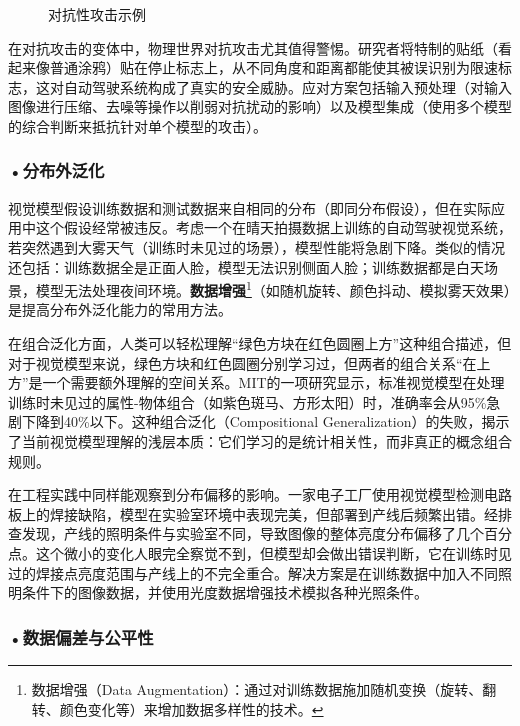 \begin{figure}[H]
\centering
{}
\caption{对抗性攻击示例}
\label{fig:ch2_2_20}
\end{figure}

在对抗攻击的变体中，物理世界对抗攻击尤其值得警惕。研究者将特制的贴纸（看起来像普通涂鸦）贴在停止标志上，从不同角度和距离都能使其被误识别为限速标志，这对自动驾驶系统构成了真实的安全威胁。应对方案包括输入预处理（对输入图像进行压缩、去噪等操作以削弱对抗扰动的影响）以及模型集成（使用多个模型的综合判断来抵抗针对单个模型的攻击）。

\subsubsection*{\textbf{•分布外泛化}}

视觉模型假设训练数据和测试数据来自相同的分布（即同分布假设），但在实际应用中这个假设经常被违反。考虑一个在晴天拍摄数据上训练的自动驾驶视觉系统，若突然遇到大雾天气（训练时未见过的场景），模型性能将急剧下降。类似的情况还包括：训练数据全是正面人脸，模型无法识别侧面人脸；训练数据都是白天场景，模型无法处理夜间环境。\textbf{数据增强}\footnote{数据增强（Data Augmentation）：通过对训练数据施加随机变换（旋转、翻转、颜色变化等）来增加数据多样性的技术。}（如随机旋转、颜色抖动、模拟雾天效果）是提高分布外泛化能力的常用方法。

在组合泛化方面，人类可以轻松理解“绿色方块在红色圆圈上方”这种组合描述，但对于视觉模型来说，绿色方块和红色圆圈分别学习过，但两者的组合关系“在上方”是一个需要额外理解的空间关系。MIT的一项研究显示，标准视觉模型在处理训练时未见过的属性-物体组合（如紫色斑马、方形太阳）时，准确率会从95\%急剧下降到40\%以下。这种组合泛化（Compositional Generalization）的失败，揭示了当前视觉模型理解的浅层本质：它们学习的是统计相关性，而非真正的概念组合规则。

在工程实践中同样能观察到分布偏移的影响。一家电子工厂使用视觉模型检测电路板上的焊接缺陷，模型在实验室环境中表现完美，但部署到产线后频繁出错。经排查发现，产线的照明条件与实验室不同，导致图像的整体亮度分布偏移了几个百分点。这个微小的变化人眼完全察觉不到，但模型却会做出错误判断，它在训练时见过的焊接点亮度范围与产线上的不完全重合。解决方案是在训练数据中加入不同照明条件下的图像数据，并使用光度数据增强技术模拟各种光照条件。

\subsubsection*{\textbf{•数据偏差与公平性}}


